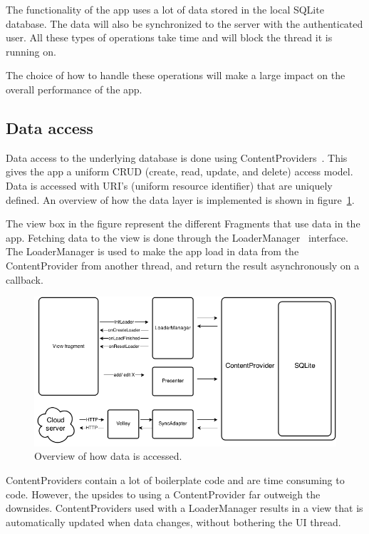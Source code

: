 The functionality of the app uses a lot of data stored in the local SQLite database. The data will also be synchronized to the server with the authenticated user. All these types of operations take time and will block the thread it is running on.

The choice of how to handle these operations will make a large impact on the overall performance of the app.


\subsection{Data access}
Data access to the underlying database is done using ContentProviders~\cite{contentproviders}. This gives the app a uniform \gls{CRUD} (create, read, update, and delete) access model. Data is accessed with \gls{URI}'s (uniform resource identifier) that are uniquely defined. An overview of how the data layer is implemented is shown in figure~\ref{fig:archAppOverview}.

The view box in the figure represent the different Fragments that use data in the app. Fetching data to the view is done through the LoaderManager~\cite{loadermanager} interface. The LoaderManager is used to make the app load in data from the ContentProvider from another thread, and return the result asynchronously on a callback. 

\begin{figure}[H]
\includegraphics[width=\textwidth]{ch/architecture/fig/arch_app_overview.png}
\caption{Overview of how data is accessed.}
\label{fig:archAppOverview}
\end{figure}

ContentProviders contain a lot of boilerplate code and are time consuming to code. However, the upsides to using a ContentProvider far outweigh the downsides. ContentProviders used with a LoaderManager results in a view that is automatically updated when data changes, without bothering the UI thread.

